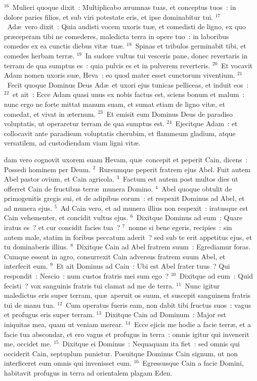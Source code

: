 ${}^{16}$~Mulieri quoque dixit~: Multiplicabo \ae rumnas tuas, et conceptus tuos~: in dolore paries filios, et sub viri potestate eris, et ipse dominabitur tui.
${}^{17}$~Ad\ae\ vero dixit~: Quia audisti vocem uxoris tu\ae , et comedisti de ligno, ex quo pr\ae ceperam tibi ne comederes, maledicta terra in opere tuo~: in laboribus comedes ex ea cunctis diebus vit\ae\ tu\ae .
${}^{18}$~Spinas et tribulos germinabit tibi, et comedes herbam terr\ae .
${}^{19}$~In sudore vultus tui vesceris pane, donec revertaris in terram de qua sumptus es~: quia pulvis es et in pulverem reverteris.
${}^{20}$~Et vocavit Adam nomen uxoris su\ae , Heva~: eo quod mater esset cunctorum viventium.
${}^{21}$~Fecit quoque Dominus Deus Ad\ae\ et uxori ejus tunicas pelliceas, et induit eos~:
${}^{22}$~et ait~: Ecce Adam quasi unus ex nobis factus est, sciens bonum et malum~: nunc ergo ne forte mittat manum suam, et sumat etiam de ligno vit\ae , et comedat, et vivat in \ae ternum.
${}^{23}$~Et emisit eum Dominus Deus de paradiso voluptatis, ut operaretur terram de qua sumptus est.
${}^{24}$~Ejecitque Adam~: et collocavit ante paradisum voluptatis cherubim, et flammeum gladium, atque versatilem, ad custodiendam viam ligni vit\ae .

\bchapter
{}dam vero cognovit uxorem suam Hevam, qu\ae\ concepit et peperit Cain, dicens~: Possedi hominem per Deum.
${}^{2}$~Rursumque peperit fratrem ejus Abel. Fuit autem Abel pastor ovium, et Cain agricola.
${}^{3}$~Factum est autem post multos dies ut offerret Cain de fructibus terr\ae\ munera Domino.
${}^{4}$~Abel quoque obtulit de primogenitis gregis sui, et de adipibus eorum~: et respexit Dominus ad Abel, et ad munera ejus.
${}^{5}$~Ad Cain vero, et ad munera illius non respexit~: iratusque est Cain vehementer, et concidit vultus ejus.
${}^{6}$~Dixitque Dominus ad eum~: Quare iratus es~? et cur concidit facies tua~?
${}^{7}$~nonne si bene egeris, recipies~: sin autem male, statim in foribus peccatum aderit~? sed sub te erit appetitus ejus, et tu dominaberis illius.
${}^{8}$~Dixitque Cain ad Abel fratrem suum~: Egrediamur foras. Cumque essent in agro, consurrexit Cain adversus fratrem suum Abel, et interfecit eum.
${}^{9}$~Et ait Dominus ad Cain~: Ubi est Abel frater tuus~? Qui respondit~: Nescio~: num custos fratris mei sum ego~?
${}^{10}$~Dixitque ad eum~: Quid fecisti~? vox sanguinis fratris tui clamat ad me de terra.
${}^{11}$~Nunc igitur maledictus eris super terram, qu\ae\ aperuit os suum, et suscepit sanguinem fratris tui de manu tua.
${}^{12}$~Cum operatus fueris eam, non dabit tibi fructus suos~: vagus et profugus eris super terram.
${}^{13}$~Dixitque Cain ad Dominum~: Major est iniquitas mea, quam ut veniam merear.
${}^{14}$~Ecce ejicis me hodie a facie terr\ae , et a facie tua abscondar, et ero vagus et profugus in terra~: omnis igitur qui invenerit me, occidet me.
${}^{15}$~Dixitque ei Dominus~: Nequaquam ita fiet~: sed omnis qui occiderit Cain, septuplum punietur. Posuitque Dominus Cain signum, ut non interficeret eum omnis qui invenisset eum.
${}^{16}$~Egressusque Cain a facie Domini, habitavit profugus in terra ad orientalem plagam Eden.


